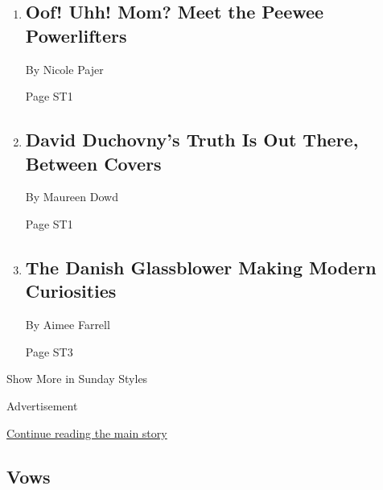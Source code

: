 \begin{enumerate}
\def\labelenumi{\arabic{enumi}.}
\item
  \href{/2018/04/26/style/is-it-safe-for-kids-to-power-lift.html}{}

  \hypertarget{oof-uhh-mom-meet-the-peewee-powerlifters}{%
  \subsection{Oof! Uhh! Mom? Meet the Peewee
  Powerlifters}\label{oof-uhh-mom-meet-the-peewee-powerlifters}}

  By Nicole Pajer

  Page ST1
\item
  \href{/2018/04/28/style/david-duchovny.html}{}

  \hypertarget{david-duchovnys-truth-is-out-there-between-covers-1}{%
  \subsection{David Duchovny's Truth Is Out There, Between
  Covers}\label{david-duchovnys-truth-is-out-there-between-covers-1}}

  By Maureen Dowd

  Page ST1
\item
  \href{/2018/04/24/t-magazine/art/steffen-dam-danish-glassblower.html}{}

  \hypertarget{the-danish-glassblower-making-modern-curiosities}{%
  \subsection{The Danish Glassblower Making Modern
  Curiosities}\label{the-danish-glassblower-making-modern-curiosities}}

  By Aimee Farrell

  Page ST3
\end{enumerate}

Show More in Sunday Styles

Advertisement

\protect\hyperlink{after-mid7}{Continue reading the main story}

\hypertarget{vows}{%
\subsection{Vows}\label{vows}}

